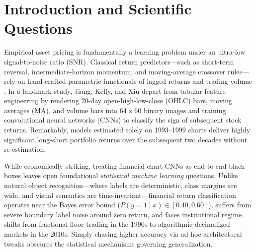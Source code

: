\documentclass[10pt]{article}
\begin{document}
\section{Introduction and Scientific Questions}

Empirical asset pricing is fundamentally a learning problem under an ultra-low signal-to-noise ratio (SNR). Classical return predictors---such as short-term reversal, intermediate-horizon momentum, and moving-average crossover rules---rely on hand-crafted parametric functionals of lagged returns and trading volume \cite{jegadeesh1993returns,lo2000foundations}. In a landmark study, Jiang, Kelly, and Xiu \cite{jiang2023reimagining} depart from tabular feature engineering by rendering 20-day open-high-low-close (OHLC) bars, moving averages (MA), and volume bars into $64 \times 60$ binary images and training convolutional neural networks (CNNs) to classify the sign of subsequent stock returns. Remarkably, models estimated solely on 1993--1999 charts deliver highly significant long-short portfolio returns over the subsequent two decades without re-estimation.

While economically striking, treating financial chart CNNs as end-to-end black boxes leaves open foundational \emph{statistical machine learning} questions. Unlike natural object recognition---where labels are deterministic, class margins are wide, and visual semantics are time-invariant---financial return classification operates near the Bayes error bound ($P(y=1 \mid x) \in [0.40, 0.60]$), suffers from severe boundary label noise around zero return, and faces institutional regime shifts from fractional floor trading in the 1990s to algorithmic decimalized markets in the 2010s. Simply chasing higher accuracy via ad-hoc architectural tweaks obscures the statistical mechanisms governing generalization.
\end{document}
